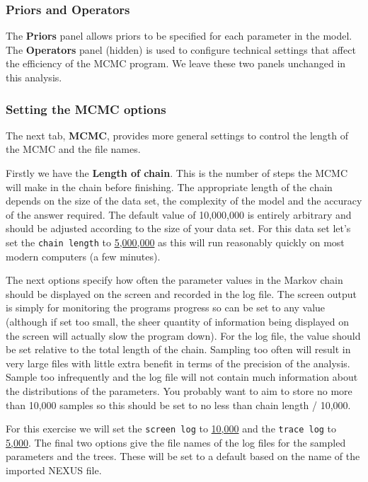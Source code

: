 \documentclass{article}
\newcommand{\chainLength}{{5,000,000}}
\newcommand{\logEvery}{{5,000}}
\newcommand{\screenEvery}{{10,000}}
\begin{document}
\subsubsection*{Priors and Operators}

The {\bf Priors} panel allows priors to be specified for each parameter in the model. 
The {\bf Operators} panel (hidden) is used to configure technical settings that affect the efficiency of the MCMC program. 
We leave these two panels unchanged in this analysis.

\subsubsection*{Setting the MCMC options }

The next tab, {\bf MCMC}, provides more general
settings to control the length of the MCMC and the file names. 

Firstly we have the \textbf{Length of chain}. This is the number of
steps the MCMC will make in the chain before finishing. The appropriate length of the chain depends on the size of the data set, the complexity of the
model and the accuracy of the answer required. The default value of 10,000,000
is entirely arbitrary and should be adjusted according to the size
of your data set. For this data set let's set the \texttt{chain
length} to \underline{\chainLength{}} as this will run reasonably quickly on most modern
computers (a few minutes).

The next options specify how often the parameter values in the Markov
chain should be displayed on the screen and recorded in the log file.
The screen output is simply for monitoring the programs progress so
can be set to any value (although if set too small, the sheer quantity
of information being displayed on the screen will actually slow the
program down). For the log file, the value should be set relative
to the total length of the chain. Sampling too often will result in
very large files with little extra benefit in terms of the precision
of the analysis. Sample too infrequently and the log file will not
contain much information about the distributions of the parameters. 
You probably want to aim to store no more than 10,000 samples so this should be
set to no less than chain length / 10,000.

For this exercise we will set the \texttt{screen log} to \underline{\screenEvery{}} and the \texttt{trace log} to \underline{\logEvery{}}. The final two
options give the file names of the log files for the sampled parameters and
the trees. These will be set to a default based on the name of the
imported NEXUS file. 
\end{document}

